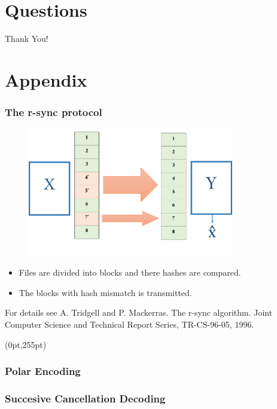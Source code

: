 \documentclass[xcolor=dvipsnames]{beamer}
\newcommand\hypercorner[1]{%
  \begin{textblock*}{\paperwidth}(0pt,255pt)
    \raggedleft #1\hspace{.5em}
  \end{textblock*}}
\begin{document}
\section{Questions}
\begin{frame}
\centering
\Huge Thank You!
\end{frame}

\section{Appendix}
\begin{frame}[label = rsync]
\frametitle{The r-sync protocol }
\begin{figure}
\centering
\includegraphics[width=9cm]{./rsync.png}
\end{figure}
\begin{itemize}
\item Files are divided into blocks and there hashes are compared.
\item The blocks with hash mismatch is transmitted.
\end{itemize}
\tiny For details see A. Tridgell and P. Mackerras. The r-sync algorithm. Joint Computer Science and
Technical Report Series, TR-CS-96-05, 1996.
\hypercorner{\hyperlink{rsynccomp}{}}
\end{frame}
\begin{frame}[label = polarencode]
\frametitle{Polar Encoding}
\hyperlink{polarencodedecode}{}
\end{frame}
\begin{frame}[label = polardecode]
\frametitle{Succesive Cancellation Decoding}
\hyperlink{polarencodedecode}{}
\end{frame}
\end{document}
